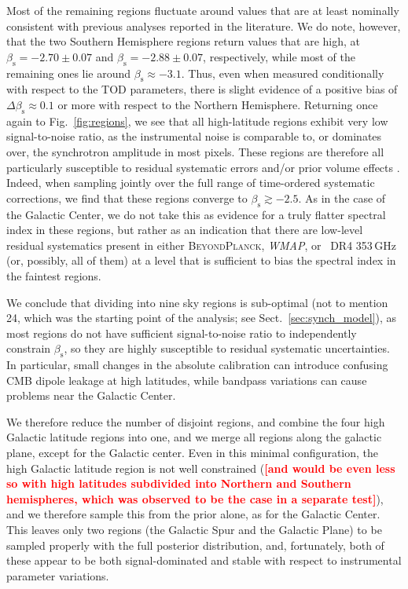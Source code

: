 \documentclass[twocolumn]{aa}
\def\WMAP{\textit{WMAP}}
\newcommand{\BP}{\textsc{BeyondPlanck}}
\newcommand{\?}[1]{\textcolor{red}{{\bf [#1]}}}
\begin{document}
Most of the remaining regions fluctuate around values that are at least
nominally consistent with previous analyses reported in the literature. We do
note, however, that the two Southern Hemisphere regions return values that are
high, at $\beta_{\mathrm{s}}=-2.70\pm0.07$ and
$\beta_{\mathrm{s}}=-2.88\pm0.07$, respectively, while most of the remaining
ones lie around $\beta_{\mathrm{s}}\approx-3.1$. Thus, even when measured
conditionally with respect to the TOD parameters, there is slight evidence of a
positive bias of $\Delta\beta_{\mathrm{s}}\approx0.1$ or more with respect to
the Northern Hemisphere. Returning once again to Fig.~\ref{fig:regions}, we see
that all high-latitude regions exhibit very low signal-to-noise ratio, as the
instrumental noise is comparable to, or dominates over, the synchrotron
amplitude in most pixels. These regions are therefore all particularly
susceptible to residual systematic errors and/or prior volume effects
\citep[e.g.,][]{dunkley2009b}. Indeed, when sampling jointly over the full range
of time-ordered systematic corrections, we find that these regions converge to
$\beta_{\mathrm{s}}\gtrsim-2.5$. As in the case of the Galactic Center, we do
not take this as evidence for a truly flatter spectral index in these regions,
but rather as an indication that there are low-level residual systematics
present in either \BP, \WMAP, or \Planck\ DR4 353\,GHz (or, possibly, all of them) at
a level that is sufficient to bias the spectral index in the faintest regions. 

We conclude that dividing into nine sky regions is sub-optimal (not to
mention 24, which was the starting point of the analysis; see
Sect.~\ref{sec:synch_model}), as most regions do not have sufficient
signal-to-noise ratio to independently constrain $\beta_{\mathrm{s}}$,
so they are highly susceptible to residual systematic
uncertainties. In particular, small changes in the absolute
calibration can introduce confusing CMB dipole leakage at high
latitudes, while bandpass variations can cause problems near the
Galactic Center. 

We therefore reduce the number of disjoint regions, and combine the four high
Galactic latitude regions into one, and we merge all regions along the galactic
plane, except for the Galactic center. Even in this minimal configuration, the
high Galactic latitude region is not well constrained (\textbf{\?{and would be
even less so with high latitudes subdivided into Northern and Southern
hemispheres, which was observed to be the case in a separate test}}), and we
therefore sample this from the prior alone, as for the Galactic Center. This
leaves only two regions (the Galactic Spur and the Galactic Plane) to be sampled
properly with the full posterior distribution, and, fortunately, both of these
appear to be both signal-dominated and stable with respect to instrumental
parameter variations.
\end{document}
